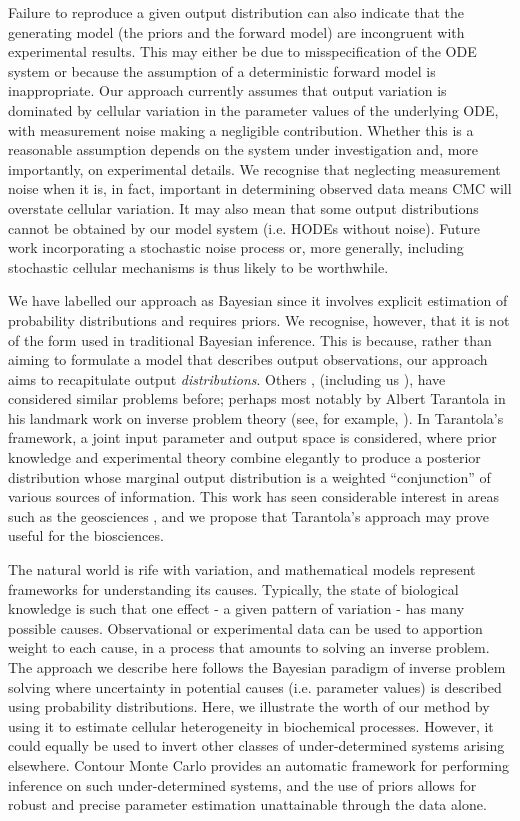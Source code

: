 Failure to reproduce a given output distribution can also indicate that the generating model (the priors and the forward model) are incongruent with experimental results. This may either be due to misspecification of the ODE system or because the assumption of a deterministic forward model is inappropriate. Our approach currently assumes that output variation is dominated by cellular variation in the parameter values of the underlying ODE, with measurement noise making a negligible contribution. Whether this is a reasonable assumption depends on the system under investigation and, more importantly, on experimental details. We recognise that neglecting measurement noise when it is, in fact, important in determining observed data means CMC will overstate cellular variation. It may also mean that some output distributions cannot be obtained by our model system (i.e. HODEs without noise). Future work incorporating a stochastic noise process or, more generally, including stochastic cellular mechanisms is thus likely to be worthwhile.

We have labelled our approach as Bayesian since it involves explicit estimation of probability distributions and requires priors. We recognise, however, that it is not of the form used in traditional Bayesian inference. This is because, rather than aiming to formulate a model that describes output observations, our approach aims to recapitulate output \emph{distributions}. Others \cite{BJW-18}, (including us \cite{lambert2018inverse}), have considered similar problems before; perhaps most notably by Albert Tarantola in his landmark work on inverse problem theory (see, for example, \cite{tarantola2005inverse}). In Tarantola's framework, a joint input parameter and output space is considered, where prior knowledge and experimental theory combine elegantly to produce a posterior distribution whose marginal output distribution is a weighted ``conjunction'' of various sources of information. This work has seen considerable interest in areas such as the geosciences \cite{mosegaard1995monte,vukicevic2008analysis}, and we propose that Tarantola's approach may prove useful for the biosciences.


The natural world is rife with variation, and mathematical models represent frameworks for understanding its causes. Typically, the state of biological knowledge is such that one effect - a given pattern of variation - has many possible causes. Observational or experimental data can be used to apportion weight to each cause, in a process that amounts to solving an inverse problem. The approach we describe here follows the Bayesian paradigm of inverse problem solving where uncertainty in potential causes (i.e. parameter values) is described using probability distributions. Here, we illustrate the worth of our method by using it to estimate cellular heterogeneity in biochemical processes. However, it could equally be used to invert other classes of under-determined systems arising elsewhere. Contour Monte Carlo provides an automatic framework for performing inference on such under-determined systems, and the use of priors allows for robust and precise parameter estimation unattainable through the data alone.

